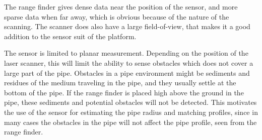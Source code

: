The range finder gives dense data near the position of the sensor, and more sparse data
when far away, which is obvious because of the nature of the scanning. The scanner does
also have a large field-of-view, that makes it a good addition to the sensor suit of the
platform. 

The sensor is limited to planar measurement. Depending on the position of the laser
scanner, this will limit the ability to sense obstacles which does not cover a large part 
of the pipe. Obstacles in a pipe environment might be sediments and residues of the medium
traveling in the pipe, and they usually settle at the bottom of the pipe. If the range
finder is placed high above the ground in the pipe, these sediments and potential
obstacles will not be detected. This motivates the use of the sensor for estimating the
pipe radius and matching profiles, since in many cases the obstacles in the pipe will not
affect the pipe profile, seen from the range finder. 


